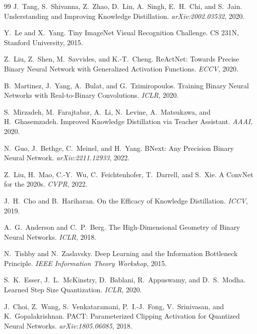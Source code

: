 \begin{thebibliography}{99}
J.~Tang, S.~Shivanna, Z.~Zhao, D.~Lin, A.~Singh, E.~H.~Chi, and S.~Jain.
\newblock Understanding and Improving Knowledge Distillation.
\newblock \emph{arXiv:2002.03532}, 2020.

Y.~Le and X.~Yang.
\newblock Tiny ImageNet Visual Recognition Challenge.
\newblock CS 231N, Stanford University, 2015.

Z.~Liu, Z.~Shen, M.~Savvides, and K.-T.~Cheng.
\newblock ReActNet: Towards Precise Binary Neural Network with Generalized Activation Functions.
\newblock \emph{ECCV}, 2020.

B.~Martinez, J.~Yang, A.~Bulat, and G.~Tzimiropoulos.
\newblock Training Binary Neural Networks with Real-to-Binary Convolutions.
\newblock \emph{ICLR}, 2020.

S.~Mirzadeh, M.~Farajtabar, A.~Li, N.~Levine, A.~Matsukawa, and H.~Ghasemzadeh.
\newblock Improved Knowledge Distillation via Teacher Assistant.
\newblock \emph{AAAI}, 2020.

N.~Guo, J.~Bethge, C.~Meinel, and H.~Yang.
\newblock BNext: Any Precision Binary Neural Network.
\newblock \emph{arXiv:2211.12933}, 2022.

Z.~Liu, H.~Mao, C.-Y.~Wu, C.~Feichtenhofer, T.~Darrell, and S.~Xie.
\newblock A ConvNet for the 2020s.
\newblock \emph{CVPR}, 2022.

J.~H.~Cho and B.~Hariharan.
\newblock On the Efficacy of Knowledge Distillation.
\newblock \emph{ICCV}, 2019.

A.~G.~Anderson and C.~P.~Berg.
\newblock The High-Dimensional Geometry of Binary Neural Networks.
\newblock \emph{ICLR}, 2018.

N.~Tishby and N.~Zaslavsky.
\newblock Deep Learning and the Information Bottleneck Principle.
\newblock \emph{IEEE Information Theory Workshop}, 2015.

S.~K.~Esser, J.~L.~McKinstry, D.~Bablani, R.~Appuswamy, and D.~S.~Modha.
\newblock Learned Step Size Quantization.
\newblock \emph{ICLR}, 2020.

J.~Choi, Z.~Wang, S.~Venkataramani, P.~I.-J.~Fong, V.~Srinivasan, and K.~Gopalakrishnan.
\newblock PACT: Parameterized Clipping Activation for Quantized Neural Networks.
\newblock \emph{arXiv:1805.06085}, 2018.


\end{thebibliography}
